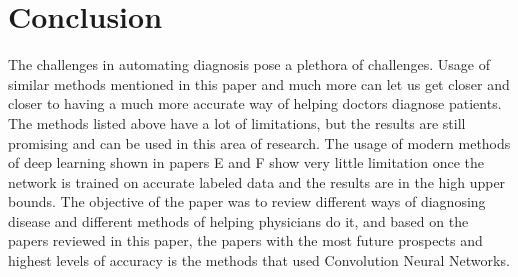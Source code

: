 \documentclass[conference]{IEEEtran}
\begin{document}




\section{Conclusion}
The challenges in automating diagnosis pose a plethora of challenges. Usage of similar methods mentioned in this paper and much more can let us get closer and closer to having a much more accurate way of helping doctors diagnose patients. The methods listed above have a lot of limitations, but the results are still promising and can be used in this area of research. The usage of modern methods of deep learning shown in papers E and F show very little limitation once the network is trained on accurate labeled data and the results are in the high upper bounds. The objective of the paper was to review different ways of diagnosing disease and different methods of helping physicians do it, and based on the  papers reviewed in this paper, the papers with the most future prospects and highest levels of accuracy is the methods that used Convolution Neural Networks. 













\end{document}
